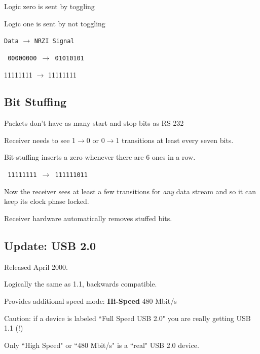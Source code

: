 \documentclass{article}	%
\begin{document}
Logic zero is sent by toggling

Logic one is sent by not toggling

{\tt Data} $\to$ {\tt NRZI Signal }

{\tt
00000000 $\to$  01010101

11111111 $\to$  11111111
}

\subsection{Bit Stuffing}

Packets don't have as many start and stop bits as RS-232

Receiver needs to see 1$\to$0 or 0$\to$1 transitions at
least every seven bits.

Bit-stuffing inserts a zero whenever there are 6 ones
in a row.

{\tt
11111111 $\to$  111111011
}

Now the receiver sees at least a few transitions for {\it any}
data stream and so it can keep its clock phase locked.

Receiver hardware automatically removes stuffed bits.

\subsection{Update: USB 2.0 }

Released April 2000.

Logically the same as 1.1, backwards compatible.

Provides additional speed mode:  {\bf Hi-Speed}  480 Mbit/s

Caution: if a device is labeled ``Full Speed USB 2.0" you are really getting USB 1.1 (!)

Only ``High Speed" or ``480 Mbit/s" is a ``real" USB 2.0 device.
\end{document}
